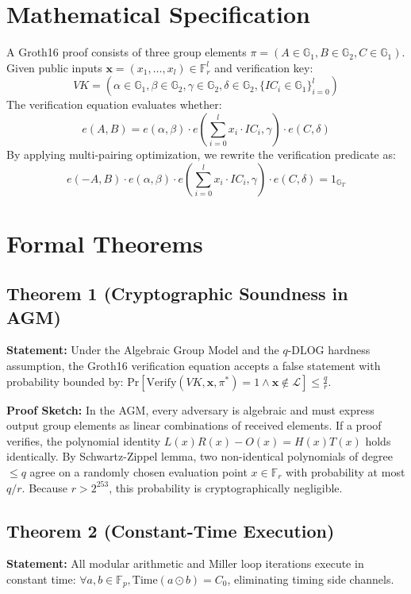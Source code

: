 \documentclass[10pt,journal,compsoc]{IEEEtran}
\begin{document}
\section{Mathematical Specification}
A Groth16 proof consists of three group elements $\pi = (A \in \mathbb{G}_1, B \in \mathbb{G}_2, C \in \mathbb{G}_1)$.
Given public inputs $\mathbf{x} = (x_1, \dots, x_l) \in \mathbb{F}_r^l$ and verification key:
$$VK = \left( \alpha \in \mathbb{G}_1, \beta \in \mathbb{G}_2, \gamma \in \mathbb{G}_2, \delta \in \mathbb{G}_2, \{IC_i \in \mathbb{G}_1\}_{i=0}^l \right)$$
The verification equation evaluates whether:
$$e(A, B) = e(\alpha, \beta) \cdot e\left( \sum_{i=0}^l x_i \cdot IC_i, \gamma \right) \cdot e(C, \delta)$$
By applying multi-pairing optimization, we rewrite the verification predicate as:
$$e(-A, B) \cdot e(\alpha, \beta) \cdot e\left( \sum_{i=0}^l x_i \cdot IC_i, \gamma \right) \cdot e(C, \delta) = 1_{\mathbb{G}_T}$$

\section{Formal Theorems}
\subsection{Theorem 1 (Cryptographic Soundness in AGM)}
\textbf{Statement:} Under the Algebraic Group Model and the $q$-DLOG hardness assumption, the Groth16 verification equation accepts a false statement with probability bounded by: $\text{Pr}[\text{Verify}(VK, \mathbf{x}, \pi^*) = 1 \wedge \mathbf{x} \notin \mathcal{L}] \le \frac{q}{r}$.

\textbf{Proof Sketch:} In the AGM, every adversary is algebraic and must express output group elements as linear combinations of received elements. If a proof verifies, the polynomial identity $L(x) R(x) - O(x) = H(x) T(x)$ holds identically. By Schwartz-Zippel lemma, two non-identical polynomials of degree $\le q$ agree on a randomly chosen evaluation point $x \in \mathbb{F}_r$ with probability at most $q/r$. Because $r > 2^{253}$, this probability is cryptographically negligible.

\subsection{Theorem 2 (Constant-Time Execution)}
\textbf{Statement:} All modular arithmetic and Miller loop iterations execute in constant time: $\forall a, b \in \mathbb{F}_p, \text{Time}(a \odot b) = C_0$, eliminating timing side channels.
\end{document}
